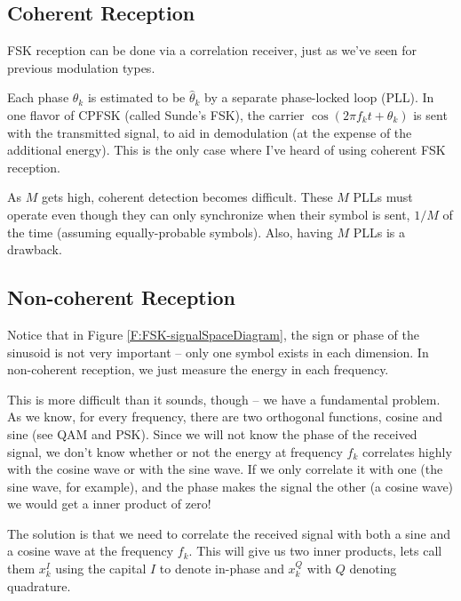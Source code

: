 \subsection{Coherent Reception}

FSK reception can be done via a correlation receiver, just as we've
seen for previous modulation types.

Each phase $\theta_k$ is estimated to be $\hat{\theta}_k$ by a
separate phase-locked loop (PLL). In one flavor of CPFSK (called Sunde's FSK), the carrier $\cos(2\pi f_k t + \theta_k)$ is sent with
the transmitted signal, to aid in demodulation (at the expense of
the additional energy).  This is the only case where I've heard of
using coherent FSK reception.

As $M$ gets high, coherent detection becomes difficult.  These $M$
PLLs must operate even though they can only synchronize when their
symbol is sent, $1/M$ of the time (assuming equally-probable
symbols). Also, having $M$ PLLs is a drawback.


\subsection{Non-coherent Reception}

Notice that in Figure \ref{F:FSK-signalSpaceDiagram}, the sign or
phase of the sinusoid is not very important -- only one symbol
exists in each dimension.  In non-coherent reception, we just
measure the energy in each frequency.

This is more difficult than it sounds, though -- we have a
fundamental problem. As we know, for every frequency, there are two
orthogonal functions, cosine and sine (see QAM and PSK).  Since we
will not know the phase of the received signal, we don't know
whether or not the energy at frequency $f_{k}$ correlates highly with
the cosine wave or with the sine wave.  If we only correlate it with
one (the sine wave, for example), and the phase makes the signal the
other (a cosine wave) we would get a inner product of zero!

The solution is that we need to correlate the received signal with
both a sine and a cosine wave at the frequency $f_{k}$.  This will
give us two inner products, lets call them $x_{k}^I$ using the
capital $I$ to denote in-phase and $x_{k}^Q$ with $Q$ denoting
quadrature.

